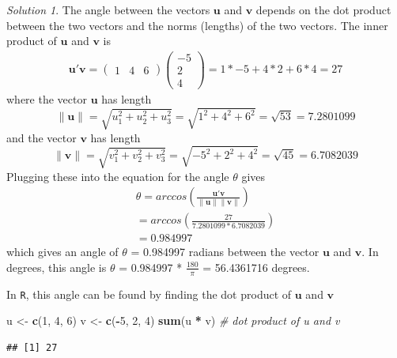 \documentclass[
]{book}
\newenvironment{Shaded}{\begin{snugshade}}{\end{snugshade}}
\newcommand{\CommentTok}[1]{\textcolor[rgb]{0.56,0.35,0.01}{\textit{#1}}}
\newcommand{\DecValTok}[1]{\textcolor[rgb]{0.00,0.00,0.81}{#1}}
\newcommand{\KeywordTok}[1]{\textcolor[rgb]{0.13,0.29,0.53}{\textbf{#1}}}
\newcommand{\NormalTok}[1]{#1}
\newcommand{\OperatorTok}[1]{\textcolor[rgb]{0.81,0.36,0.00}{\textbf{#1}}}
\newcommand{\StringTok}[1]{\textcolor[rgb]{0.31,0.60,0.02}{#1}}
\theoremstyle{definition}
\theoremstyle{definition}
\theoremstyle{definition}
\theoremstyle{definition}
\theoremstyle{remark}
\newtheorem*{solution}{Solution}
\begin{document}
\begin{solution}

The angle between the vectors \(\mathbf{u}\) and \(\mathbf{v}\) depends on the dot product between the two vectors and the norms (lengths) of the two vectors. The inner product of \(\mathbf{u}\) and \(\mathbf{v}\) is
\[
\begin{aligned}
\mathbf{u}'\mathbf{v} = \begin{pmatrix} 1 & 4 & 6 \end{pmatrix} \begin{pmatrix} -5 \\ 2 \\ 4 \end{pmatrix} = 1*-5 +4*2 + 6*4 = 27
\end{aligned}
\]
where the vector \(\mathbf{u}\) has length
\[
\|\mathbf{u}\| = \sqrt{u_1^2 + u_2^2 + u_3^2} = \sqrt{1^2 + 4^2 + 6^2} = \sqrt{53} = 7.2801099
\]
and the vector \(\mathbf{v}\) has length
\[
\|\mathbf{v}\| = \sqrt{v_1^2 + v_2^2 + v_3^2} = \sqrt{-5^2 + 2^2 + 4^2} = \sqrt{45} = 6.7082039
\]
Plugging these into the equation for the angle \(\theta\) gives
\[
\begin{aligned}
\theta = arccos \left( \frac{\mathbf{u}' \mathbf{v}}{\| \mathbf{u} \| \| \mathbf{v} \|} \right) \\
= arccos \left( \frac{27}{ 7.2801099 * 6.7082039} \right) \\
= 0.984997
\end{aligned}
\]
which gives an angle of \(\theta\) = 0.984997 radians between the vector \(\mathbf{u}\) and \(\mathbf{v}\). In degrees, this angle is \(\theta\) = 0.984997 * \(\frac{180}{\pi}\) = 56.4361716 degrees.

In \texttt{R}, this angle can be found by finding the dot product of \(\mathbf{u}\) and \(\mathbf{v}\)

\begin{Shaded}
\begin{Highlighting}[]
\NormalTok{u <-}\StringTok{ }\KeywordTok{c}\NormalTok{(}\DecValTok{1}\NormalTok{, }\DecValTok{4}\NormalTok{, }\DecValTok{6}\NormalTok{)}
\NormalTok{v <-}\StringTok{ }\KeywordTok{c}\NormalTok{(}\OperatorTok{-}\DecValTok{5}\NormalTok{, }\DecValTok{2}\NormalTok{, }\DecValTok{4}\NormalTok{)}
\KeywordTok{sum}\NormalTok{(u }\OperatorTok{*}\StringTok{ }\NormalTok{v) }\CommentTok{# dot product of u and v}
\end{Highlighting}
\end{Shaded}

\begin{verbatim}
## [1] 27
\end{verbatim}


\end{solution}
\end{document}
